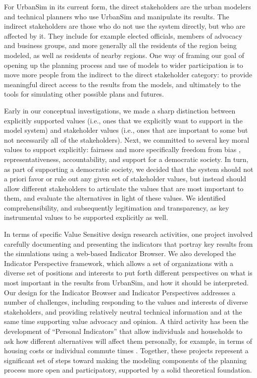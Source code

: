 For UrbanSim in its current form, the direct stakeholders are the
urban modelers and technical planners who use UrbanSim and
manipulate its results.  The indirect stakeholders are those who
do not use the system directly, but who are affected by it.  They
include for example elected officials, members of advocacy and
business groups, and more generally all the residents of the
region being modeled, as well as residents of nearby regions.  One
way of framing our goal of opening up the planning process and use
of models to wider participation is to move more people from the
indirect to the direct stakeholder category: to provide meaningful
direct access to the results from the models, and ultimately to
the tools for simulating other possible plans and futures.

Early in our conceptual investigations, we made a sharp distinction between
explicitly supported values (i.e., ones that we explicitly want to support
in the model system) and stakeholder values (i.e., ones that are important
to some but not necessarily all of the stakeholders).  Next, we committed
to several key moral values to support explicitly: fairness and more
specifically freedom from bias \cite{friedman-tois-1996},
representativeness, accountability, and support for a democratic society.
In turn, as part of supporting a democratic society, we decided that the
system should not a priori favor or rule out any given set of stakeholder
values, but instead should allow different stakeholders to articulate the
values that are most important to them, and evaluate the alternatives in
light of these values.  We identified comprehensibility, and subsequently 
legitimation and transparency, as key instrumental values to be supported
explicitly as well.

In terms of specific Value Sensitive design research activities, one
project involved carefully documenting and presenting the indicators that
portray key results from the simulations \cite{borning-ecscw-2005} using a
web-based Indicator Browser.  We also developed the Indicator Perspective
framework, which allows a set of organizations with a diverse set of
positions and interests to put forth different perspectives on what is most
important in the results from UrbanSim, and how it should be interpreted.
Our design for the Indicator Browser and Indicator Perspectives addresses a
number of challenges, including responding to the values and interests of
diverse stakeholders, and providing relatively neutral technical
information and at the same time supporting value advocacy and opinion.  A
third activity has been the development of ``Personal Indicators'' that
allow individuals and households to ask how different alternatives will
affect them personally, for example, in terms of housing costs or
individual commute times \cite{davis-chi-2006,davis-phd}.  Together, these
projects represent a significant set of steps toward making the modeling
components of the planning process more open and participatory, supported
by a solid theoretical foundation.

